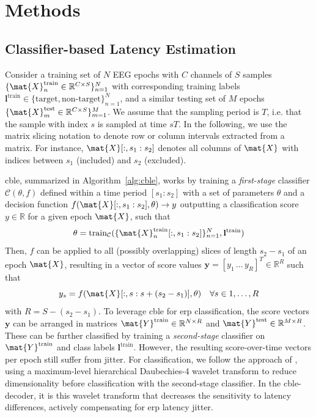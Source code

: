 \section{Methods}
\label{sec:wcble/methods}

\subsection{Classifier-based Latency Estimation}
\label{sec:wcble/methods/cble}

Consider a training set of $N$ EEG epochs with $C$ channels of $S$
samples $\{\mat{X}_n^\mathrm{train} \in \mathbb{R}^{C\times S}\}_{n=1}^N$
with corresponding training labels $\mathbf{l^\mathrm{train}} \in \{\mathrm{target},
	\textrm{non-target}\}_{n=1}^N$, and a
similar testing set of $M$ epochs $\{\mat{X}_m^\mathrm{test} \in
	\mathbb{R}^{C\times S}\}_{m=1}^M$.
We assume that the sampling period is $T$, i.e. that the sample with index $s$ is sampled at time $sT$.
In the following, we use the matrix slicing notation to denote row or column intervals extracted from a matrix.
For instance, $\mat{X}[:,s_1:s_2]$ denotes all columns of $\mat{X}$ with indices between $s_1$ (included) and $s_2$ (excluded).

\Ac{cble}, summarized in Algorithm~\ref{alg:cble}, works by training a
\textit{first-stage} classifier $\mathcal{C}(\theta,f)$
defined within a time period $[s_1:s_2]$ with a set of parameters $\theta$ and a
decision function $f(\mat{X}[:,s_1:s_2],\theta) \rightarrow
y$ outputting a classification score $y\in\mathbb{R}$ for a given epoch $\mat{X}$,
such that
\begin{equation}
  \theta = \mathrm{train}_\mathcal{C}(\{\mat{X}_n^\mathrm{train}[:,s_1:s_2]\}_{n=1}^N,\mathbf{l}^\mathrm{train})
  \label{eq:cble-train}
\end{equation}
Then,
$f$ can be applied to all (possibly overlapping) slices of length $s_2-s_1$ of
an epoch $\mat{X}$, resulting in a vector of score values
$\mathbf{y}=[y_1\,\ldots\,y_R]^T \in\mathbb{R}^R$ such that
\begin{equation}
  y_s = f(\mat{X}[:,s:s+(s_2-s_1)],\theta)\quad \forall s\in 1,\ldots,R
	\label{eq:score}
\end{equation}
with $R = S-(s_2-s_1)$.
To leverage \ac{cble} for \ac{erp} classification, the score vectors $\mathbf{y}$ can be
arranged in matrices $\mat{Y}^\mathrm{train}\in\mathbb{R}^{N\times R}$ and $\mat{Y}^\mathrm{test}\in\mathbb{R}^{M\times R}$.
These can be further classified by training a \textit{second-stage} classifier on
$\mat{Y}^\mathrm{train}$ and class labels $\mathbf{l}^\mathrm{train}$.
However, the resulting score-over-time vectors per epoch still suffer from jitter.
For classification, we follow the approach of \cite{Mowla2017}, using a
maximum-level hierarchical Daubechies-4 wavelet transform to reduce
dimensionality before classification with the second-stage classifier.
In the \ac{cble}-decoder, it is this wavelet transform that decreases the sensitivity
to latency differences, actively compensating for \ac{erp} latency jitter.

